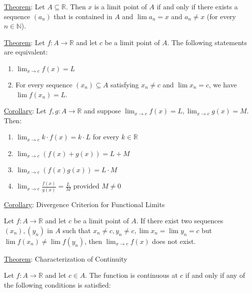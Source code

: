 \documentclass[12pt]{article}
\newcommand{\RR}{\mathbb{R}} %
\newcommand{\NN}{\mathbb{N}}
\begin{document}
\hrulefill

\underline{Theorem}: Let $A \subseteq \RR$. Then $x$ is a limit point of $A$ if and only if there exists a sequence $(a_n)$ that is contained in $A$ and $\lim a_n = x$ and $a_n \ne x$ (for every $n \in \NN$).

\hrulefill

\underline{Theorem}: Let $f : A \rightarrow \RR$ and let $c$ be a limit point of $A$. The following statements are equivalent:

\begin{enumerate}
\item $\lim_{x \rightarrow c} f(x) = L$

\item For every sequence $(x_n) \subseteq A$ satisfying $x_n \ne c$ and $\lim x_n = c$, we have $\lim f(x_n) = L$.
\end{enumerate}

\hrulefill

\underline{Corollary}: Let $f, g : A \rightarrow \RR$ and suppose $\lim_{x \rightarrow c} f(x) = L, \lim_{x \rightarrow c} g(x) = M$. Then:

\begin{enumerate}
\item $\lim_{x \rightarrow c} k \cdot f(x) = k \cdot L$ for every $k \in \RR$

\item $\lim_{x \rightarrow c} (f(x) + g(x)) = L + M$

\item $\lim_{x \rightarrow c} (f(x)g(x)) = L \cdot M$

\item $\lim_{x \rightarrow c} \frac{f(x)}{g(x)} = \frac{L}{M}$ provided $M \ne 0$
\end{enumerate}

\hrulefill

\underline{Corollary}: Divergence Criterion for Functional Limits

Let $f : A \rightarrow \RR$ and let $c$ be a limit point of $A$. If there exist two sequences $(x_n), (y_n)$ in $A$ such that $x_n \ne c, y_n \ne c, \lim x_n = \lim y_n = c$ but $\lim f(x_n) \ne \lim f(y_n)$, then $\lim_{x \rightarrow c} f(x)$ does not exist.

\pagebreak

\underline{Theorem}: Characterization of Continuity

Let $f : A \rightarrow \RR$ and let $c \in A$. The function is continuous at $c$ if and only if any of the following conditions is satisfied:
\end{document}
